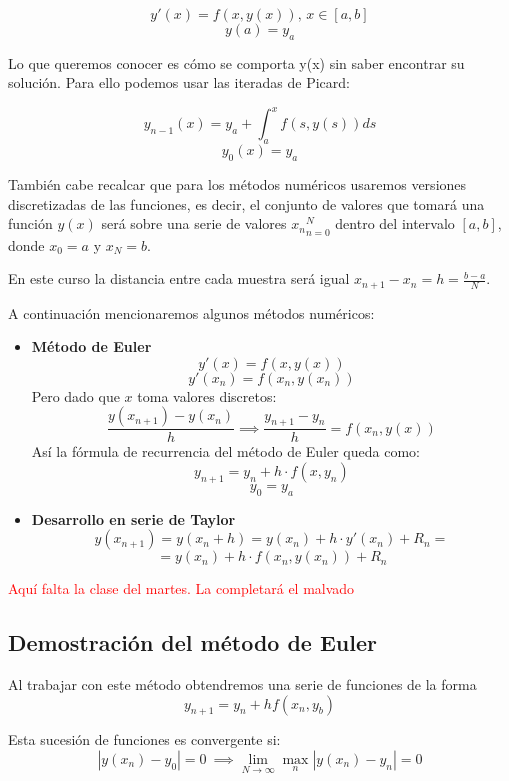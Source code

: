 \documentclass{apuntes}
\begin{document}
\[y'(x) = f(x,y(x)) \text{, } x∈[a,b]\]
\[y(a)=y_a\]

Lo que queremos conocer es cómo se comporta y(x) sin saber encontrar su solución. Para ello podemos usar las iteradas de Picard:

\[y_{n-1}(x) = y_a + \int_a^x f(s,y(s)) ds\]
\[y_0(x) = y_a\]

También cabe recalcar que para los métodos numéricos usaremos versiones discretizadas de las funciones, es decir, el conjunto de valores que tomará una función $y(x)$ será sobre una serie de valores ${x_n}_{n=0}^N$ dentro del intervalo $[a,b]$, donde $x_0=a$ y $x_N=b$.

En este curso la distancia entre cada muestra será igual $x_{n+1}-x_n=h=\frac{b-a}{N}$.

A continuación mencionaremos algunos métodos numéricos:
\begin{itemize}
	\item \textbf{Método de Euler}
	\[y'(x) = f(x,y(x))\]
	\[y'(x_n) = f(x_n,y(x_n))\]
	Pero dado que $x$ toma valores discretos:
	\[\frac{y(x_{n+1}) - y(x_n)}{h} \implies \frac{y_{n+1} - y_n}{h} = f(x_n,y(x))\]
	Así la fórmula de recurrencia del método de Euler queda como:
	\[y_{n+1} = y_n + h·f(x,y_n)\]
	\[y_0=y_a\]

	\item \textbf{Desarrollo en serie de Taylor}
	\[y(x_{n+1}) = y(x_n+h) = y(x_n) + h·y'(x_n) + R_n =\]
	\[= y(x_n) + h·f(x_n,y(x_n)) + R_n\]
\end{itemize}

\textcolor{red}{Aquí falta la clase del martes. La completará el malvado}

\subsection{Demostración del método de Euler}
Al trabajar con este método obtendremos una serie de funciones de la forma
\[y_{n+1} = y_n + h f(x_n, y_b)\]

Esta sucesión de funciones es convergente si:
\[|y(x_n)-y_0 | = 0 \ \implies \lim_{N \to \infty} \max_n |y(x_n)-y_n| = 0\]
\end{document}
